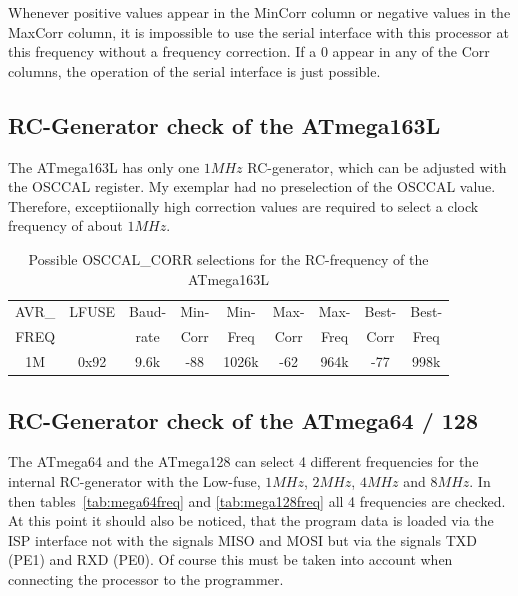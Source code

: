 Whenever positive values appear in the MinCorr column or negative values in the MaxCorr
column, it is impossible to use the serial interface with this processor at this frequency 
without a frequency correction.
If a 0 appear in any of the Corr columns, the operation of the serial interface
is just possible.

\subsection{RC-Generator check of the ATmega163L}

The ATmega163L has only one \(1MHz\) RC-generator, which can be adjusted
with the OSCCAL register.
My exemplar had no preselection of the OSCCAL value.
Therefore, exceptiionally high correction values are required to select
a clock frequency of about \(1MHz\).

\begin{table}[H]
  \begin{center}
    \begin{tabular}{| c | c | c || c | c || c | c || c | c |}
    \hline
             AVR\_ & LFUSE & Baud- & Min- & Min- & Max- & Max- & Best- & Best-  \\
             FREQ  &       & rate & Corr & Freq & Corr & Freq  & Corr  & Freq  \\
    \hline
    \hline
                1M & 0x92  &  9.6k &  -88  & 1026k &  -62  & 964k  & -77  &  998k \\
    \hline
    \end{tabular}
  \end{center}
  \caption{Possible OSCCAL\_CORR selections for the RC-frequency of the ATmega163L}
  \label{tab:mega163freq}
\end{table}

\subsection{RC-Generator check of the ATmega64 / 128}

The ATmega64 and the ATmega128 can select 4 different frequencies for the
internal RC-generator with the Low-fuse, \(1MHz\), \(2MHz\), \(4MHz\) and \(8MHz\).
In then tables~\ref{tab:mega64freq} and \ref{tab:mega128freq} all 4 frequencies
are checked.
At this point it should also be noticed, that the program data is loaded via the ISP
interface not with the signals MISO and MOSI but via the signals TXD (PE1) and
RXD (PE0). Of course this must be taken into account when connecting the
processor to the programmer.

